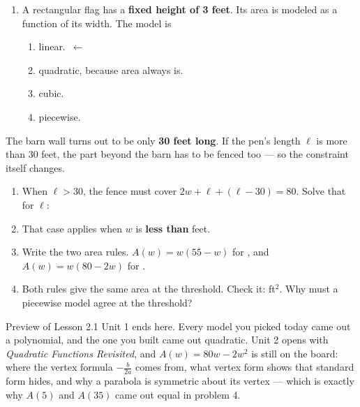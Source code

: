 \documentclass[10pt]{article}
\begin{document}
\begin{enumerate}[itemsep=10pt]
\begin{enumerate}[label=(\alph*), itemsep=6pt]
  \item A rectangular flag has a \textbf{fixed height of 3 feet}. Its area is
        modeled as a function of its width. The model is

        \begin{enumerate}[label=\Alph*., itemsep=2pt]
          \item linear.~\textcolor{keyred}{\textbf{$\leftarrow$}}
          \item quadratic, because area always is.
          \item cubic.
          \item piecewise.
        \end{enumerate}
\end{enumerate}

\end{enumerate}

\vspace{0.1in}

\boxguard
\begin{extensionbox}
The barn wall turns out to be only \textbf{30 feet long}. If the pen's length
$\ell$ is more than 30 feet, the part beyond the barn has to be fenced too ---
so the constraint itself changes.

\begin{enumerate}[label=(\alph*), itemsep=4pt]
  \item When $\ell > 30$, the fence must cover $2w + \ell + (\ell - 30) = 80$.
        Solve that for $\ell$: 
  \item That case applies when $w$ is \textbf{less than}  feet.
  \item Write the two area rules. \quad $A(w) = w(55 - w)$ for
        , \quad and $A(w) = w(80 - 2w)$ for .
  \item Both rules give the same area at the threshold. Check it:
         ft$^2$. Why must a piecewise model agree at the threshold?

\end{enumerate}
\end{extensionbox}

\vspace{0.1in}

\boxguard
\begin{notesbox}{Preview of Lesson 2.1}
Unit 1 ends here. Every model you picked today came out a polynomial, and the
one you built came out quadratic. Unit 2 opens with \textit{Quadratic Functions
Revisited}, and $A(w) = 80w - 2w^2$ is still on the board: where the vertex
formula $-\frac{b}{2a}$ comes from, what vertex form shows that standard form
hides, and why a parabola is symmetric about its vertex --- which is exactly
why $A(5)$ and $A(35)$ came out equal in problem 4.
\end{notesbox}
\end{document}
